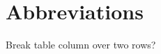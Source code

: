 
\newpage
\section{Abbreviations}
\begin{itemize*}
     \item{} Break table column over two rows?
\end{itemize*}

